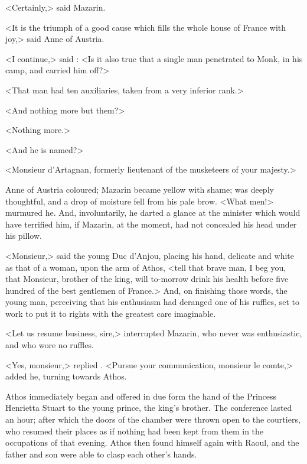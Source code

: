<Certainly,> said Mazarin.

<It is the triumph of a good cause which fills the whole house of France with joy,> said Anne of Austria.

<I continue,> said : <Is it also true that a single man penetrated to Monk, in his camp, and carried him off?>

<That man had ten auxiliaries, taken from a very inferior rank.>

<And nothing more but them?>

<Nothing more.>

<And he is named?>

<Monsieur d'Artagnan, formerly lieutenant of the musketeers of your majesty.>

Anne of Austria coloured; Mazarin became yellow with shame;  was deeply thoughtful, and a drop of moisture fell from his pale brow. <What men!> murmured he. And, involuntarily, he darted a glance at the minister which would have terrified him, if Mazarin, at the moment, had not concealed his head under his pillow.

<Monsieur,> said the young Duc d'Anjou, placing his hand, delicate and white as that of a woman, upon the arm of Athos, <tell that brave man, I beg you, that Monsieur, brother of the king, will to-morrow drink his health before five hundred of the best gentlemen of France.> And, on finishing those words, the young man, perceiving that his enthusiasm had deranged one of his ruffles, set to work to put it to rights with the greatest care imaginable.

<Let us resume business, sire,> interrupted Mazarin, who never was enthusiastic, and who wore no ruffles.

<Yes, monsieur,> replied . <Pursue your communication, monsieur le comte,> added he, turning towards Athos.

Athos immediately began and offered in due form the hand of the Princess Henrietta Stuart to the young prince, the king's brother. The conference lasted an hour; after which the doors of the chamber were thrown open to the courtiers, who resumed their places as if nothing had been kept from them in the occupations of that evening. Athos then found himself again with Raoul, and the father and son were able to clasp each other's hands. 